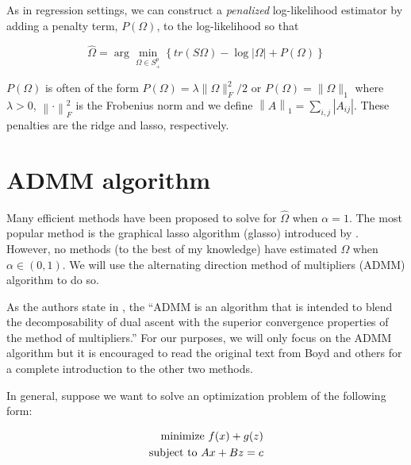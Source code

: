 \documentclass[11pt,]{report}
\begin{document}
As in regression settings, we can construct a \emph{penalized} log-likelihood estimator by adding a penalty term, \(P\left(\Omega\right)\), to the log-likelihood so that

\begin{equation}
\hat{\Omega} = \arg\min_{\Omega \in S_{+}^{p}}\left\{ tr\left(S\Omega\right) - \log\left|\Omega \right| + P\left( \Omega \right) \right\}
\label{eq:omegapen}
\end{equation}

\(P\left( \Omega \right)\) is often of the form \(P\left(\Omega \right) = \lambda\|\Omega \|_{F}^{2}/2\) or \(P\left(\Omega \right) = \|\Omega\|_{1}\) where \(\lambda > 0\), \(\left\|\cdot \right\|_{F}^{2}\) is the Frobenius norm and we define \(\left\|A \right\|_{1} = \sum_{i, j} \left| A_{ij} \right|\). These penalties are the ridge and lasso, respectively.

\hypertarget{admm-algorithm}{%
\section{ADMM algorithm}\label{admm-algorithm}}

Many efficient methods have been proposed to solve for \(\hat{\Omega}\) when \(\alpha = 1\). The most popular method is the graphical lasso algorithm (glasso) introduced by \citet{friedman2008sparse}. However, no methods (to the best of my knowledge) have estimated \(\Omega\) when \(\alpha \in (0, 1)\). We will use the alternating direction method of multipliers (ADMM) algorithm to do so.

As the authors state in \citet{boyd2011distributed}, the ``ADMM is an algorithm that is intended to blend the decomposability of dual ascent with the superior convergence properties of the method of multipliers.'' For our purposes, we will only focus on the ADMM algorithm but it is encouraged to read the original text from Boyd and others for a complete introduction to the other two methods.

In general, suppose we want to solve an optimization problem of the following form:

\begin{equation}
\begin{split}
  \mbox{minimize } f(x) + g(z) \\
  \mbox{subject to } Ax + Bz = c
\end{split}
\label{eq:boyd}\notag
\end{equation}
\end{document}
